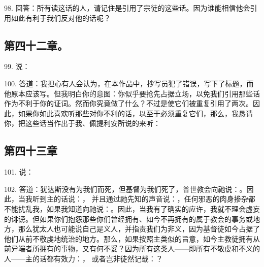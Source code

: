 98. 回答：所有读这话的人，请记住是引用了宗徒的这些话。因为谁能相信他会引用如此有利于我们反对他的话呢？\par


\subsection{第四十二章。}

99. 说：\par

100. 答道：我担心有人会认为，在本作品中，抄写员犯了错误，写下了标题，而他原本应该写。但我明白你的意图：你似乎要抢先占据立场，以免我们引用那些话作为不利于你的证词。然而你究竟做了什么？不过是使它们被重复引用了两次。因此，如果你如此喜欢听那些对你不利的话，以至于必须重复它们，那么，我恳请你，把这些话当作出于我、佩提利安所说的来听：\par


\subsection{第四十三章}

101. 说：\par

102. 答道：犹达斯没有为我们而死，但基督为我们死了，普世教会向祂说：。因此，当我听到主的话说：， 并且通过祂先知的声音说：，任何邪恶的肉身掺杂都不能扰乱我，如果我知道向祂说：。因此，当我有了确实的应许，我就不理会虚妄的诽谤。但如果你们抱怨那些你们曾经拥有、如今不再拥有的属于教会的事务或地方，那么犹太人也可能说自己是义人，并指责我们为非义，因为基督徒如今占据了他们从前不敬虔地统治的地方。那么，如果按照主类似的旨意，如今主教徒拥有从前异端者所拥有的事物，又有何不妥？因为所有这类人——即所有不敬虔和不义的人——主的话都有效力：， 或者岂非徒然记载：？\par

